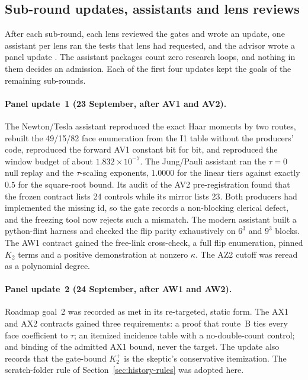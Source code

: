 \subsection{Sub-round updates, assistants and lens reviews}
\label{sec:history-updates}
After each sub-round, each lens reviewed the gates and wrote an update, one
assistant per lens ran the tests that lens had requested, and the advisor
wrote a panel update \cite{r32panel,r32lenses}. The assistant packages count
zero research loops, and nothing in them decides an admission. Each of the
first four updates kept the goals of the remaining sub-rounds.

\paragraph{Panel update~1 (23 September, after AV1 and AV2).}
The Newton/Tesla assistant reproduced the exact Haar moments by two routes,
rebuilt the 49/15/82 face enumeration from the I1 table without the
producers' code, reproduced the forward AV1 constant bit for bit, and
reproduced the window budget of about $1.832\times10^{-7}$. The Jung/Pauli
assistant ran the $\tau=0$ null replay and the $\tau$-scaling exponents,
$1.0000$ for the linear tiers against exactly $0.5$ for the square-root
bound. Its audit of the AV2 pre-registration found that the frozen contract
lists 24 controls while its mirror lists 23. Both producers had implemented
the missing id, so the gate records a non-blocking clerical defect, and the
freezing tool now rejects such a mismatch. The modern assistant built a
python-flint harness and checked the flip parity exhaustively on $6^3$ and
$9^3$ blocks. The AW1 contract gained the free-link cross-check, a full flip
enumeration, pinned $K_2$ terms and a positive demonstration at nonzero
$\kappa$. The AZ2 cutoff was reread as a polynomial degree.

\paragraph{Panel update~2 (24 September, after AW1 and AW2).}
Roadmap goal~2 was recorded as met in its re-targeted, static form. The AX1
and AX2 contracts gained three requirements: a proof that route~B ties every
face coefficient to $\tau$; an itemized incidence table with a
no-double-count control; and binding of the admitted AX1 bound, never the
target. The update also records that the gate-bound $K_2^+$ is the skeptic's
conservative itemization. The scratch-folder rule of
Section~\ref{sec:history-rules} was adopted here.

